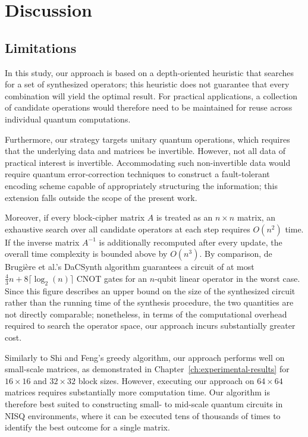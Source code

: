 \chapter{Discussion}
\label{ch:discussion}

\section{Limitations}

In this study, our approach is based on a depth-oriented heuristic that searches for a set of synthesized operators; this heuristic does not guarantee that every combination will yield the optimal result. For practical applications, a collection of candidate operations would therefore need to be maintained for reuse across individual quantum computations.

Furthermore, our strategy targets unitary quantum operations, which requires that the underlying data and matrices be invertible. However, not all data of practical interest is invertible. Accommodating such non-invertible data would require quantum error-correction techniques to construct a fault-tolerant encoding scheme capable of appropriately structuring the information; this extension falls outside the scope of the present work.

Moreover, if every block-cipher matrix $A$ is treated as an $n \times n$ matrix, an exhaustive search over all candidate operators at each step requires $O(n^{2})$ time. If the inverse matrix $A^{-1}$ is additionally recomputed after every update, the overall time complexity is bounded above by $O(n^{3})$. By comparison, de Brugière et al.'s DaCSynth algorithm guarantees a circuit of at most $\frac{4}{3}n + 8\lceil \log_2(n) \rceil$ CNOT gates for an $n$-qubit linear operator in the worst case. Since this figure describes an upper bound on the size of the synthesized circuit rather than the running time of the synthesis procedure, the two quantities are not directly comparable; nonetheless, in terms of the computational overhead required to search the operator space, our approach incurs substantially greater cost.

Similarly to Shi and Feng's greedy algorithm, our approach performs well on small-scale matrices, as demonstrated in Chapter~\ref{ch:experimental-results} for $16 \times 16$ and $32 \times 32$ block sizes. However, executing our approach on $64 \times 64$ matrices requires substantially more computation time. Our algorithm is therefore best suited to constructing small- to mid-scale quantum circuits in NISQ environments, where it can be executed tens of thousands of times to identify the best outcome for a single matrix.

